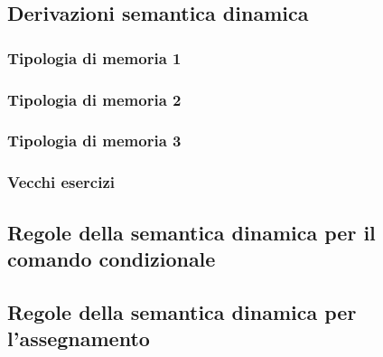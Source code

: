 \documentclass[a4paper]{article}
\begin{document}
	\subsection{Derivazioni semantica dinamica}
	
	\subsubsection{Tipologia di memoria 1}
	
	\subsubsection{Tipologia di memoria 2}
	
	\subsubsection{Tipologia di memoria 3}
	
	\subsubsection{Vecchi esercizi}
	
	\subsection{Regole della semantica dinamica per il comando condizionale}
	
	
	\subsection{Regole della semantica dinamica per l'assegnamento}
	
\end{document}
